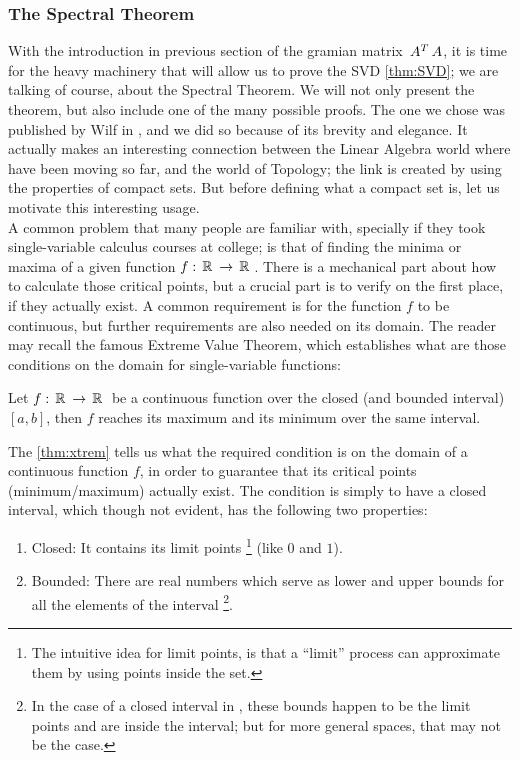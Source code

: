 \subsubsection{The Spectral Theorem}

With the introduction in previous section of the gramian matrix
$\,{A}^{T}\,A$, it is time for the heavy machinery that will allow us to
prove the SVD \cref{thm:SVD}; we are talking of course, about
the Spectral Theorem. We will not only present the theorem, but also
include one of the many possible proofs. The one we chose was published
by Wilf in \cite{wilf81}, and we did so because of its brevity and
elegance. It actually makes an interesting connection between the
Linear Algebra world where have been moving so far, and the  world of
Topology; the link is created by using the properties of compact
sets. But before defining what a compact set is, let us 
motivate this interesting usage. \\

A common problem that many people are familiar with, specially if they
took single-variable calculus courses at college; is that of finding the
minima or maxima of a given function $f: \,\mathbb{R}^{}\, \rightarrow \,\mathbb{R}^{}\,$. There is a
mechanical part about how to calculate those critical points, but a
crucial part is to verify on the first place, if they actually
exist. A common requirement is for the function $f$ to be continuous,
but further requirements are also needed on its domain. The reader may
recall the famous Extreme Value Theorem, which establishes what are those
conditions on the domain for single-variable functions: \\

\begin{theorem}
\label{thm:xtrem}
Let $f: \,\mathbb{R}^{}\, \rightarrow \,\mathbb{R}^{}\,$ be a continuous function over the closed
(and bounded interval) $[a,b]$, then $f$ reaches its maximum and its
minimum over the same interval. 
\end{theorem}
\hfill

The \cref{thm:xtrem} tells us what the required condition is on
the domain of a continuous function $f$, in order to guarantee that its
critical points (minimum/maximum) actually exist. The
condition is simply to have a closed interval, which though not
evident, has the following two properties: \\

\begin{enumerate}
\item Closed: It contains its limit points \footnote{The intuitive
  idea for limit points, is that a ``limit'' process can approximate
  them by using points inside the set.} (like $0$ and $1$).
\item Bounded: There are real numbers which serve as lower and upper
  bounds for all the elements of the interval \footnote{In the case of a closed
  interval in \R{}, these bounds happen to be the limit points and are
  inside the interval; but for more general spaces, that may not be
  the case.}.
\end{enumerate}
\hfill

